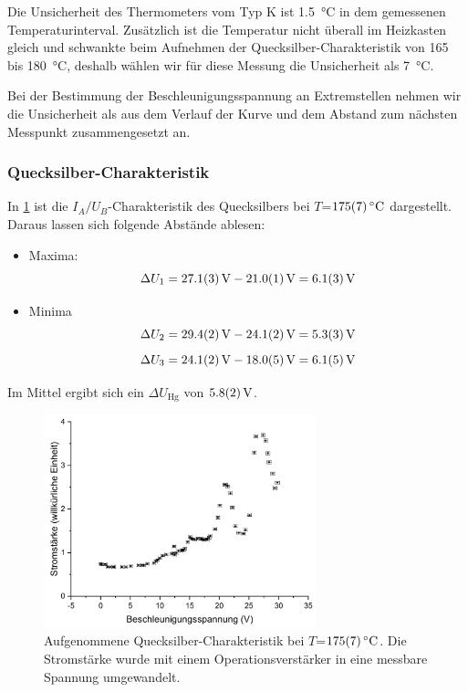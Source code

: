 \documentclass[
	a4paper,
	12pt,
	pagesize,
	ngerman
]{scrartcl}
\begin{document}
	Die Unsicherheit des Thermometers vom Typ K ist \SI{1,5}{\degreeCelsius} in dem gemessenen Temperaturinterval.\cite{DIN} 
	Zusätzlich ist die Temperatur nicht überall im Heizkasten gleich und schwankte beim Aufnehmen der Quecksilber-Charakteristik von 165 bis \SI{180}{\degreeCelsius}, deshalb wählen wir für diese Messung die Unsicherheit als \SI{7}{\degreeCelsius}.
	
	Bei der Bestimmung der Beschleunigungsspannung an Extremstellen nehmen wir die Unsicherheit als aus dem Verlauf der Kurve und dem Abstand zum nächsten Messpunkt zusammengesetzt an.
	
	\subsubsection{Quecksilber-Charakteristik}
	In \cref{Hg175} ist die $I_A/U_B$-Charakteristik des Quecksilbers bei $T$=$\SI{175 +- 7}{\degreeCelsius}$ dargestellt. Daraus lassen sich folgende Abstände ablesen:
	\begin{itemize}
		\item Maxima:
		\begin{equation*}
			\Delta{U}_1 = \SI{27,1 +- 0,3}{V} -\SI{21 +- 0,1}{V} = \SI{6,1 +- 0,3}{V}
		\end{equation*}
		\item Minima
		\begin{equation*}\Delta{U}_2 = \SI{29,4 +- 0,2}{V} -\SI{24,1 +- 0,2}{V} = \SI{5,3 +- 0,3}{V}\end{equation*}
		\begin{equation*}\Delta{U}_3 = \SI{24,1 +- 0,2}{V}- \SI{18,0 +- 0,5}{V} = \SI{6,1 +- 0,5}{V}\end{equation*}
	\end{itemize}
	Im Mittel ergibt sich ein $\Delta{U_\text{Hg}}$ von $\SI{5,8 +- 0,2}{V}$.
	
	\begin{figure}[H]
		\includegraphics[width=0.7\textwidth]{Hg175}
		\centering
		\caption{Aufgenommene Quecksilber-Charakteristik bei $T$=$\SI{175 +- 7}{\degreeCelsius}$. Die Stromstärke wurde mit einem Operationsverstärker in eine messbare Spannung umgewandelt.}
		\label{Hg175}
		\centering
	\end{figure}
\end{document}
